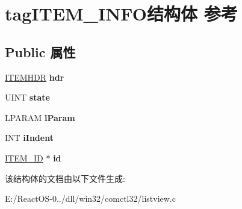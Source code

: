 \hypertarget{structtag_i_t_e_m___i_n_f_o}{}\section{tag\+I\+T\+E\+M\+\_\+\+I\+N\+F\+O结构体 参考}
\label{structtag_i_t_e_m___i_n_f_o}
\subsection*{Public 属性}
\begin{DoxyCompactItemize}
\item 
\mbox{\label{structtag_i_t_e_m___i_n_f_o_ab46c89e6118e13c4c59bc1516a360296}} 
\hyperlink{structtag_i_t_e_m_h_d_r}{I\+T\+E\+M\+H\+DR} {\bfseries hdr}
\item 
\mbox{\label{structtag_i_t_e_m___i_n_f_o_ab730ca79aca9afdaf7ef98fa521ddee7}} 
U\+I\+NT {\bfseries state}
\item 
\mbox{\label{structtag_i_t_e_m___i_n_f_o_a624a3fcdcafb95e036969ffaf529e758}} 
L\+P\+A\+R\+AM {\bfseries l\+Param}
\item 
\mbox{\label{structtag_i_t_e_m___i_n_f_o_a0b223780088bc4196f95d47021bf44f4}} 
I\+NT {\bfseries i\+Indent}
\item 
\mbox{\label{structtag_i_t_e_m___i_n_f_o_ad78a3d44f50d3a0a0f6c0fe9992f53d9}} 
\hyperlink{structtag_i_t_e_m___i_d}{I\+T\+E\+M\+\_\+\+ID} $\ast$ {\bfseries id}
\end{DoxyCompactItemize}


该结构体的文档由以下文件生成\+:\begin{DoxyCompactItemize}
\item 
E\+:/\+React\+O\+S-\/0../dll/win32/comctl32/listview.\+c\end{DoxyCompactItemize}
